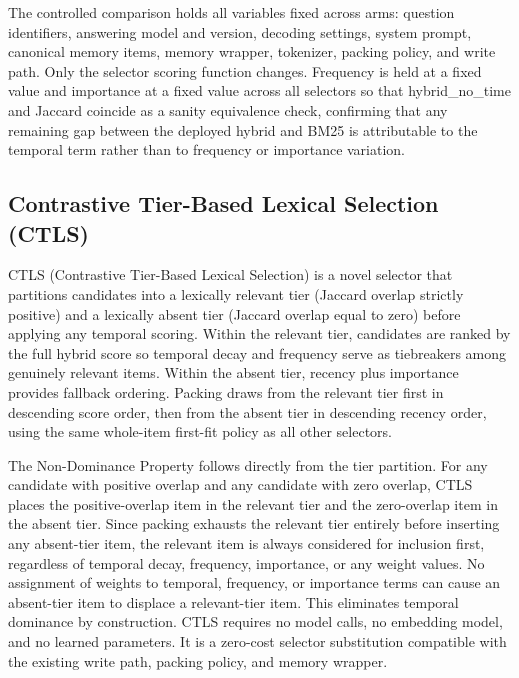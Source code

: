 The controlled comparison holds all variables fixed across arms: question identifiers, answering model and version, decoding settings, system prompt, canonical memory items, memory wrapper, tokenizer, packing policy, and write path. Only the selector scoring function changes. Frequency is held at a fixed value and importance at a fixed value across all selectors so that hybrid\_no\_time and Jaccard coincide as a sanity equivalence check, confirming that any remaining gap between the deployed hybrid and BM25 is attributable to the temporal term rather than to frequency or importance variation.

\subsection{Contrastive Tier-Based Lexical Selection (CTLS)}

\label{sec:method_ctls}

CTLS (Contrastive Tier-Based Lexical Selection) is a novel selector that partitions candidates into a lexically relevant tier (Jaccard overlap strictly positive) and a lexically absent tier (Jaccard overlap equal to zero) before applying any temporal scoring. Within the relevant tier, candidates are ranked by the full hybrid score so temporal decay and frequency serve as tiebreakers among genuinely relevant items. Within the absent tier, recency plus importance provides fallback ordering. Packing draws from the relevant tier first in descending score order, then from the absent tier in descending recency order, using the same whole-item first-fit policy as all other selectors. \citep{ref_959d6858d034c6e1}

The Non-Dominance Property follows directly from the tier partition. For any candidate with positive overlap and any candidate with zero overlap, CTLS places the positive-overlap item in the relevant tier and the zero-overlap item in the absent tier. Since packing exhausts the relevant tier entirely before inserting any absent-tier item, the relevant item is always considered for inclusion first, regardless of temporal decay, frequency, importance, or any weight values. No assignment of weights to temporal, frequency, or importance terms can cause an absent-tier item to displace a relevant-tier item. This eliminates temporal dominance by construction. CTLS requires no model calls, no embedding model, and no learned parameters. It is a zero-cost selector substitution compatible with the existing write path, packing policy, and memory wrapper. \citep{ref_ab2c226739f2f52a}

